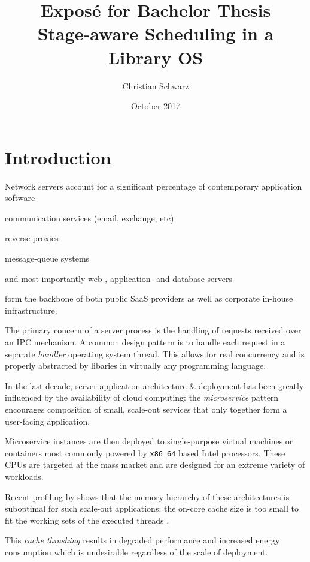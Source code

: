 \documentclass{article}
\title{{\large Exposé for Bachelor Thesis}\\Stage-aware Scheduling in a Library OS}
\author{Christian Schwarz}
\date{October 2017}
\begin{document}
\maketitle

\section{Introduction}

Network servers account for a significant percentage of contemporary application software%
\begin{itemize*}[label={}, before={{:}}, itemjoin={{,}}]
    \item communication services (email, exchange, etc)
    \item reverse proxies
    \item message-queue systems
    \item and most importantly web-, application- and database-servers
\end{itemize*}
form the backbone of both public SaaS providers as well as corporate in-house infrastructure. 

The primary concern of a server process is the handling of requests received over an IPC mechanism.
A common design pattern is to handle each request in a separate \textit{handler} operating system thread.
This allows for real concurrency and is properly abstracted by libaries in virtually any programming language.

In the last decade, server application architecture \& deployment has been greatly influenced by the availability of cloud computing:
the \textit{microservice} pattern encourages composition of small, scale-out services
that only together form a user-facing application.

Microservice instances are then deployed to single-purpose virtual machines or containers %
most commonly powered by \texttt{x86\_64} based Intel processors. %
These CPUs are targeted at the mass market and are designed for an extreme variety of workloads.

Recent profiling by \citeauthor{kanev2015profiling} shows that the memory hierarchy of these architectures
is suboptimal for such scale-out applications:
the on-core cache size is too small to fit the working sets of the executed threads \cite{kanev2015profiling}.

This \textit{cache thrashing} results in degraded performance and increased energy consumption
which is undesirable regardless of the scale of deployment.
\end{document}
